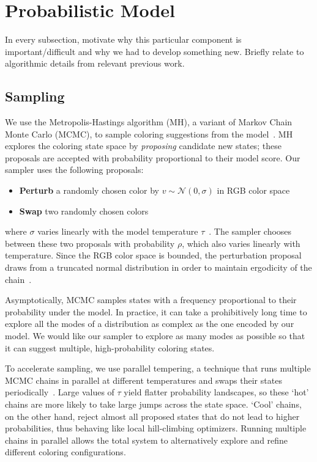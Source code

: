 \section{Probabilistic Model}
\label{sec:model}

In every subsection, motivate why this particular component is important/difficult and why we had to develop something new. Briefly relate to algorithmic details from relevant previous work.



\subsection{Sampling}
\label{sec:sampling}

We use the Metropolis-Hastings algorithm (MH), a variant of Markov Chain Monte Carlo (MCMC), to sample coloring suggestions from the model~\cite{Metropolis,Hastings}. MH explores the coloring state space by \emph{proposing} candidate new states; these proposals are accepted with probability proportional to their model score. Our sampler uses the following proposals:
\begin{itemize}
	\item{\textbf{Perturb} a randomly chosen color by $v \sim \mathcal{N}(0, \sigma)$ in RGB color space}
	\item{\textbf{Swap} two randomly chosen colors}
\end{itemize}
where $\sigma$ varies linearly with the model temperature $\tau$~. The sampler chooses between these two proposals with probability $\rho$, which also varies linearly with temperature. Since the RGB color space is bounded, the perturbation proposal draws from a truncated normal distribution in order to maintain ergodicity of the chain~\cite{TruncatedGaussians}.

Asymptotically, MCMC samples states with a frequency proportional to their probability under the model. In practice, it can take a prohibitively long time to explore all the modes of a distribution as complex as the one encoded by our model. We would like our sampler to explore as many modes as possible so that it can suggest multiple, high-probability coloring states.

To accelerate sampling, we use parallel tempering, a technique that runs multiple MCMC chains in parallel at different temperatures and swaps their states periodically~\cite{ParallelTempering}. Large values of $\tau$ yield flatter probability landscapes, so these `hot' chains are more likely to take large jumps across the state space. `Cool' chains, on the other hand, reject almost all proposed states that do not lead to higher probabilities, thus behaving like local hill-climbing optimizers. Running multiple chains in parallel allows the total system to alternatively explore and refine different coloring configurations.

